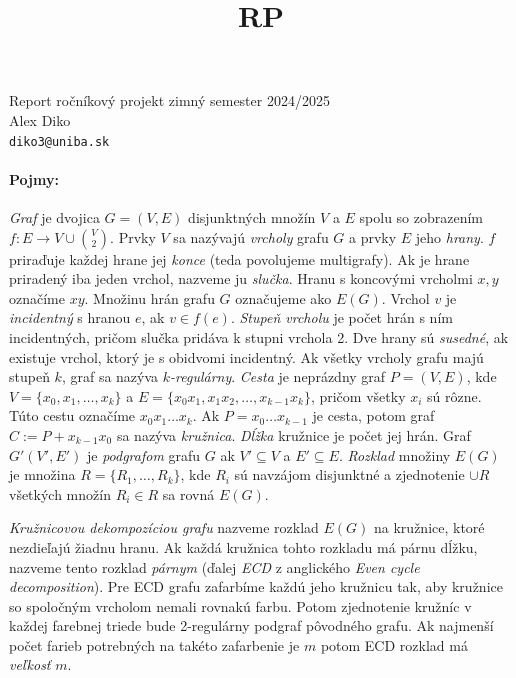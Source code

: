 \documentclass[11pt]{article}
\begin{document}
\title{RP}
\begin{center}
    {\LARGE Report ročníkový projekt zimný semester 2024/2025}\\[1em]
    {\large Alex Diko  \\ \texttt{diko3@uniba.sk}}\\[1em]
\end{center}

\paragraph{Pojmy:}

\textit{Graf} je dvojica $G = (V,E)$ disjunktných množín $V$ a $E$ spolu so zobrazením
$f:E \to V \cup \binom{V}{2} $. Prvky $V$ sa nazývajú \textit{vrcholy} grafu $G$ a prvky $E$ jeho \textit{hrany}.
$f$ priraďuje každej hrane jej \textit{konce} (teda povolujeme multigrafy). Ak je hrane priradený iba jeden vrchol, nazveme ju \textit{slučka}.
Hranu s koncovými vrcholmi $x,y$ označíme $xy$. Množinu hrán grafu $G$ označujeme ako $E(G)$. Vrchol 
$v$ je \textit{incidentný} s hranou $e$, ak $v\in f(e)$. \textit{Stupeň vrcholu} je počet
hrán s ním incidentných, pričom slučka pridáva k stupni vrchola 2. Dve hrany sú \textit{susedné}, ak existuje vrchol, ktorý je 
s obidvomi incidentný. Ak všetky vrcholy grafu
majú stupeň $k$, graf sa nazýva \textit{$k$-regulárny}. \textit{Cesta} je neprázdny graf $P = (V,E)$,
kde $V = \{x_0, x_1, \ldots, x_k\}$ a $E = \{x_0x_1, x_1x_2, \ldots, x_{k-1}x_k\}$,
pričom všetky $x_i$ sú rôzne. Túto cestu označíme $x_0x_1\ldots x_k$. Ak $P = x_0\ldots x_{k-1}$ je cesta, potom
graf $C := P + x_{k-1}x_0$ sa nazýva \textit{kružnica}. \textit{Dĺžka} kružnice je počet jej hrán. Graf
$ G'(V',E')$ je \textit{podgrafom} grafu $G$ ak $V' \subseteq V$ a $E' \subseteq E$.
\textit{Rozklad} množiny $E(G)$ je množina $R = \{R_1, \ldots, R_k\}$, kde $R_i$
sú navzájom disjunktné a zjednotenie $\cup R$ všetkých množín $R_i \in R$ sa rovná $E(G)$. \cite{diestel2024graph}

\textit{Kružnicovou dekompozíciou grafu} nazveme rozklad $E(G)$ na kružnice, ktoré nezdieľajú žiadnu
hranu. Ak každá kružnica tohto rozkladu má párnu dĺžku, nazveme tento rozklad \textit{párnym} (ďalej
\textit{ECD} z anglického \textit{Even cycle decomposition}).
Pre ECD grafu zafarbíme každú jeho kružnicu tak, aby kružnice so spoločným
vrcholom nemali rovnakú farbu. Potom zjednotenie kružníc v každej farebnej triede 
bude 2-regulárny podgraf pôvodného grafu. Ak najmenší počet farieb potrebných 
na takéto zafarbenie je $m$ potom ECD rozklad má \textit{veľkosť} $m$. \cite{MALNEGRO2024113844}
\end{document}
